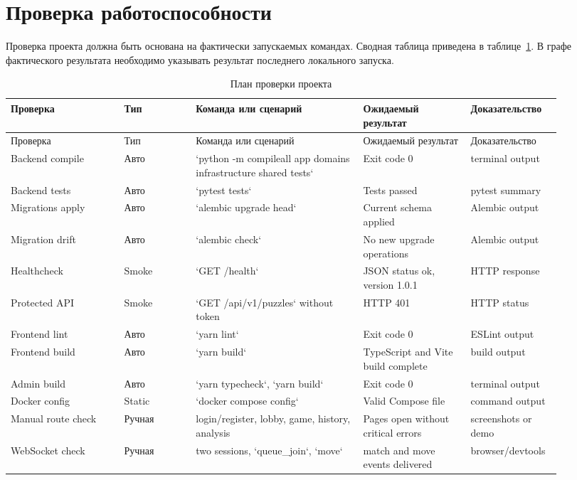 \documentclass[14pt,a4paper]{extreport}
\begin{document}
\section{Проверка работоспособности}

Проверка проекта должна быть основана на фактически запускаемых командах. Сводная таблица приведена в таблице~\ref{tab:verification}. В графе фактического результата необходимо указывать результат последнего локального запуска.

\begin{center}
\scriptsize
\setlength{\tabcolsep}{3pt}
\renewcommand{\arraystretch}{1.20}
\begin{longtable}{|>{\RaggedRight\arraybackslash}p{0.19\linewidth}|>{\RaggedRight\arraybackslash}p{0.12\linewidth}|>{\RaggedRight\arraybackslash}p{0.28\linewidth}|>{\RaggedRight\arraybackslash}p{0.18\linewidth}|>{\RaggedRight\arraybackslash}p{0.13\linewidth}|}
\caption{План проверки проекта}\label{tab:verification}\\
\hline
Проверка & Тип & Команда или сценарий & Ожидаемый результат & Доказательство\\ \hline
\endfirsthead
\hline
Проверка & Тип & Команда или сценарий & Ожидаемый результат & Доказательство\\ \hline
\endhead
Backend compile & Авто & `python -m compileall app domains infrastructure shared tests` & Exit code 0 & terminal output\\ \hline
Backend tests & Авто & `pytest tests` & Tests passed & pytest summary\\ \hline
Migrations apply & Авто & `alembic upgrade head` & Current schema applied & Alembic output\\ \hline
Migration drift & Авто & `alembic check` & No new upgrade operations & Alembic output\\ \hline
Healthcheck & Smoke & `GET /health` & JSON status ok, version 1.0.1 & HTTP response\\ \hline
Protected API & Smoke & `GET /api/v1/puzzles` without token & HTTP 401 & HTTP status\\ \hline
Frontend lint & Авто & `yarn lint` & Exit code 0 & ESLint output\\ \hline
Frontend build & Авто & `yarn build` & TypeScript and Vite build complete & build output\\ \hline
Admin build & Авто & `yarn typecheck`, `yarn build` & Exit code 0 & terminal output\\ \hline
Docker config & Static & `docker compose config` & Valid Compose file & command output\\ \hline
Manual route check & Ручная & login/register, lobby, game, history, analysis & Pages open without critical errors & screenshots or demo\\ \hline
WebSocket check & Ручная & two sessions, `queue_join`, `move` & match and move events delivered & browser/devtools\\ \hline
\end{longtable}
\end{center}
\end{document}
